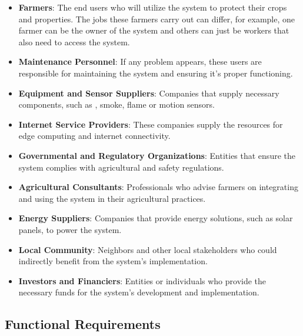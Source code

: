 \begin{itemize}
    \item \textbf{Farmers}: The end users who will utilize the system to protect their crops and properties. The jobs these farmers carry out can differ, for example, one farmer can be the owner of the system 
    and others can just be workers that also need to access the system.
    \item \textbf{Maintenance Personnel}: If any problem appears, these users are responsible for maintaining the system and ensuring it's proper functioning.
    \item \textbf{Equipment and Sensor Suppliers}: Companies that supply necessary components, such as , smoke, flame or motion sensors.
    \item \textbf{Internet Service Providers}: These companies supply the resources for edge computing and internet connectivity.
    \item \textbf{Governmental and Regulatory Organizations}: Entities that ensure the system complies with agricultural and safety regulations.
    \item \textbf{Agricultural Consultants}: Professionals who advise farmers on integrating and using the system in their agricultural practices.
    \item \textbf{Energy Suppliers}: Companies that provide energy solutions, such as solar panels, to power the system.
    \item \textbf{Local Community}: Neighbors and other local stakeholders who could indirectly benefit from the system's implementation.
    \item \textbf{Investors and Financiers}: Entities or individuals who provide the necessary funds for the system's development and implementation.
\end{itemize}

\subsection{Functional Requirements}

